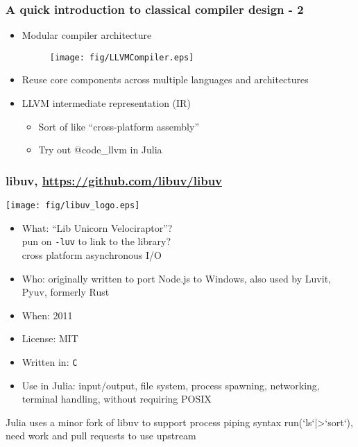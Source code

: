 \documentclass[compressed,dvips,letter]{beamer}
\begin{document}
\begin{frame}\frametitle{A quick introduction to classical compiler design - 2}
\begin{itemize}
\item Modular compiler architecture
\begin{figure}\texttt{[image: fig/LLVMCompiler.eps]}\end{figure}
\item Reuse core components across multiple languages and architectures
\item LLVM intermediate representation (IR)
\begin{itemize}
\item Sort of like ``cross-platform assembly''
\item Try out {\selectfont @code\_llvm} in Julia
\end{itemize}
\end{itemize}
\end{frame}

%
%

\begin{frame}\frametitle{libuv, \url{https://github.com/libuv/libuv}}
\vspace{10pt}
\begin{minipage}{0.35\textwidth}
\texttt{[image: fig/libuv\_logo.eps]}
\end{minipage} \begin{minipage}{0.62\textwidth}
\begin{itemize}
\item What: ``Lib Unicorn Velociraptor''? \\
pun on \texttt{-luv} to link to the library? \\
cross platform asynchronous I/O
\item Who: originally written to port Node.js to Windows, also used by Luvit, Pyuv, formerly Rust
\item When: 2011
\item License: MIT
\item Written in: \texttt{C}
\item Use in Julia: input/output, file system, process spawning, networking, terminal handling, without requiring POSIX
\end{itemize}
\end{minipage}

\vspace{15pt}
Julia uses a minor fork of libuv to support process piping syntax {\selectfont run(`ls`|>`sort`)}, need work and pull requests to use upstream

\end{frame}
\end{document}
